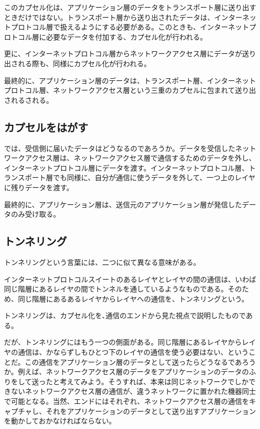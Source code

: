このカプセル化は、アプリケーション層のデータをトランスポート層に送り出すときだけではない。トランスポート層から送り出されたデータは、インターネットプロトコル層で扱えるようにする必要がある。このときも、インターネットプロトコル層に必要なデータを付加する、カプセル化が行われる。

更に、インターネットプロトコル層からネットワークアクセス層にデータが送り出される際も、同様にカプセル化が行われる。

最終的に、アプリケーション層のデータは、トランスポート層、インターネットプロトコル層、ネットワークアクセス層という三重のカプセルに包まれて送り出されるされる。

\subsection{カプセルをはがす}
では、受信側に届いたデータはどうなるのであろうか。データを受信したネットワークアクセス層は、ネットワークアクセス層で通信するためのデータを外し、インターネットプロトコル層にデータを渡す。インターネットプロトコル層、トランスポート層でも同様に、自分が通信に使うデータを外して、一つ上のレイヤに残りデータを渡す。

最終的に、アプリケーション層は、送信元のアプリケーション層が発信したデータのみ受け取る。

\subsection{トンネリング}
トンネリングという言葉には、二つに似て異なる意味がある。

インターネットプロトコルスイートのあるレイヤとレイヤの間の通信は、いわば同じ階層にあるレイヤの間でトンネルを通しているようなものである。そのため、同じ階層にあるあるレイヤからレイヤへの通信を、トンネリングという。

トンネリングは、カプセル化を､通信のエンドから見た視点で説明したものである。

だが、トンネリングにはもう一つの側面がある。同じ階層にあるレイヤからレイヤの通信は、かならずしもひとつ下のレイヤの通信を使う必要はない、ということだ。この通信をアプリケーション層のデータとして送ったらどうなるであろうか。例えば、ネットワークアクセス層のデータをアプリケーションのデータのふりをして送ったと考えてみよう。そうすれば、本来は同じネットワークでしかできないネットワークアクセス層の通信が、違うネットワークに置かれた機器同士で可能となる。当然、エンドにはそれぞれ、ネットワークアクセス層の通信をキャプチャし、それをアプリケーションのデータとして送り出すアプリケーションを動かしておかなければならない。

